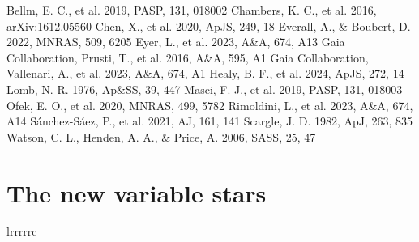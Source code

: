 \documentclass[twocolumn]{searchchev_preprint}
\begin{document}
\begin{thebibliography}{}
 Bellm, E. C., et al. 2019, PASP, 131, 018002
 Chambers, K. C., et al. 2016, arXiv:1612.05560
 Chen, X., et al. 2020, ApJS, 249, 18
 Everall, A., \& Boubert, D. 2022, MNRAS, 509, 6205
 Eyer, L., et al. 2023, A\&A, 674, A13
 Gaia Collaboration, Prusti, T., et al. 2016, A\&A, 595, A1
 Gaia Collaboration, Vallenari, A., et al. 2023, A\&A, 674, A1
 Healy, B. F., et al. 2024, ApJS, 272, 14
 Lomb, N. R. 1976, Ap\&SS, 39, 447
 Masci, F. J., et al. 2019, PASP, 131, 018003
 Ofek, E. O., et al. 2020, MNRAS, 499, 5782
 Rimoldini, L., et al. 2023, A\&A, 674, A14
 S\'anchez-S\'aez, P., et al. 2021, AJ, 161, 141
 Scargle, J. D. 1982, ApJ, 263, 835
 Watson, C. L., Henden, A. A., \& Price, A. 2006, SASS, 25, 47
\end{thebibliography}

\appendix
\section{The new variable stars}
\startlongtable
\begin{deluxetable*}{lrrrrrc}
\startdata

\enddata
\end{deluxetable*}
\end{document}
